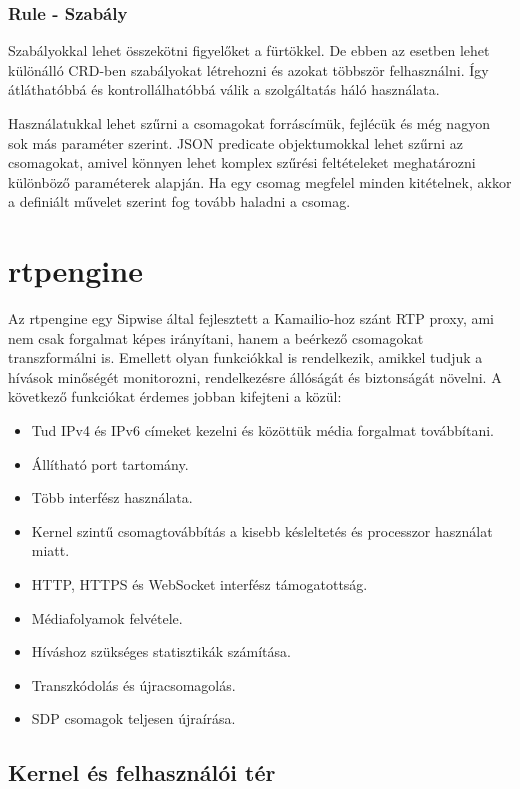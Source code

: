 \subsubsection{Rule - Szabály}

Szabályokkal lehet összekötni figyelőket a fürtökkel. De ebben az esetben lehet különálló
CRD-ben szabályokat létrehozni és azokat többször felhasználni. Így átláthatóbbá és 
kontrollálhatóbbá válik a szolgáltatás háló használata. 

Használatukkal lehet szűrni a csomagokat forráscímük, fejlécük és még nagyon sok más 
paraméter szerint. JSON predicate objektumokkal lehet szűrni az csomagokat, amivel 
könnyen lehet komplex szűrési feltételeket meghatározni különböző paraméterek alapján. Ha 
egy csomag megfelel minden kitételnek, akkor a definiált művelet szerint fog tovább 
haladni a csomag. 

\section{rtpengine}

Az rtpengine egy Sipwise  által fejlesztett a Kamailio-hoz szánt RTP 
proxy, ami nem csak forgalmat képes irányítani, hanem a beérkező csomagokat transzformálni is.
Emellett olyan funkciókkal is rendelkezik, amikkel tudjuk a hívások minőségét monitorozni, 
rendelkezésre állóságát és biztonságát növelni. A következő funkciókat érdemes 
jobban kifejteni a \cite{rtpengine} közül: 

\begin{itemize}
	\item Tud IPv4 és IPv6 címeket kezelni és közöttük média forgalmat továbbítani. 
	\item Állítható port tartomány. 
	\item Több interfész használata. 
	\item Kernel szintű csomagtovábbítás a kisebb késleltetés és processzor használat miatt.
	\item HTTP, HTTPS és WebSocket interfész támogatottság.
	\item Médiafolyamok felvétele. 
	\item Híváshoz szükséges statisztikák számítása.
	\item Transzkódolás és újracsomagolás.
	\item SDP csomagok teljesen újraírása. 
\end{itemize}

\subsection{Kernel és felhasználói tér}

